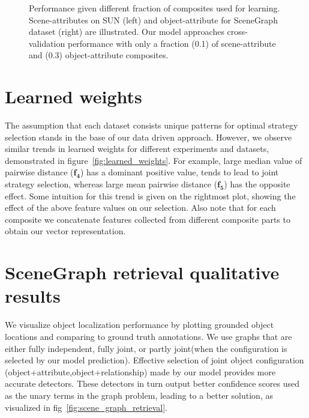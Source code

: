 \documentclass[runningheads]{llncs}
\begin{document}
\begin{figure}
    \centering
    \qquad
    \caption{Performance given different fraction of composites used for learning. Scene-attributes on SUN  (left) and object-attribute for SceneGraph dataset (right) are illustrated. Our model approaches cross-validation performance with only a fraction (0.1) of scene-attribute and (0.3) object-attribute composites.}%
    \label{fig:learning_portions}%
\end{figure}


\section{Learned weights}
The assumption that each dataset consists unique patterns for optimal strategy selection stands in the base of our data driven approach. However, we observe similar trends in learned weights for different experiments and datasets, demonstrated in figure~\ref{fig:learned_weights}. For example, large median value of pairwise distance ($\mathbf{f_4}$) has a dominant positive value, tends to lead to joint strategy selection, whereas large mean pairwise distance ($\mathbf{f_5}$) has the opposite effect. Some intuition for this trend is given on the rightmost plot, showing the effect of the above feature values on our selection. Also note that for each composite we concatenate features collected from different composite parts to obtain our vector representation.

\section{SceneGraph retrieval qualitative results}
We visualize object localization performance by plotting grounded object locations and comparing to ground truth annotations. We use graphs that are either fully independent, fully joint, or partly joint(when the configuration is selected by our model prediction). Effective selection of joint object configuration (object+attribute,object+relationship) made by our model provides more accurate detectors. These detectors in turn output better confidence scores used as the unary terms in the graph problem, leading to a better solution, as visualized in fig~\ref{fig:scene_graph_retrieval}. 
\end{document}
